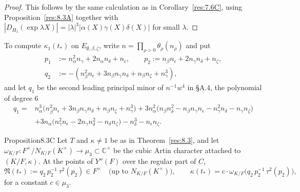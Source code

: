 \documentclass[12pt,letterpaper]{amsart}
\theoremstyle{plain}
\theoremstyle{definition}
\theoremstyle{remark}
\theoremstyle{definition}
\begin{document}
\begin{proof}
This follows by the same calculation as in Corollary~\ref{res:7.6C}, using
Proposition~\ref{res:8.3A} together with
$|D_{H_1}(\exp\lambda X)|=|\lambda|^3|\alpha(X)\gamma(X)\delta(X)|$ for small $\lambda$.
\end{proof}

To compute $\kappa_1(t_*)$ on $E_{\emptyset,\beta,\zeta}$, write
$n=\prod_{\rho>0}\theta_\rho(n_\rho)$ and put
\begin{equation}\tag{8.7b}\label{eq:8.7b}
\begin{split}
p_1&:=n_\alpha^2n_\gamma+2n_\alpha n_\delta+n_\epsilon,\qquad
p_2:=n_\beta n_\epsilon+2n_\gamma n_\delta+n_\zeta,\\
q_2&:=-(n_\beta^2n_\epsilon+3n_\beta n_\gamma n_\delta+n_\beta n_\zeta+n_\gamma^3),
\end{split}
\end{equation}
and let $q_1$ be the second leading principal minor of $n^{-1}w^4$ in \S A.4,
the polynomial of degree $6$
\begin{equation}\tag{8.7b$'$}\label{eq:8.7bprime}
\begin{split}
q_1={}&n_\alpha^3\bigl(n_\beta^2n_\epsilon+3n_\beta n_\gamma n_\delta+n_\beta n_\zeta+n_\gamma^3\bigr)
+3n_\alpha^2\bigl(n_\beta n_\delta^2-n_\beta n_\gamma n_\epsilon-n_\gamma^2n_\delta-n_\gamma n_\zeta\bigr)\\
&+3n_\alpha\bigl(n_\gamma^2n_\epsilon-2n_\gamma n_\delta^2-n_\delta n_\zeta\bigr)
-n_\delta^3-n_\epsilon n_\zeta .
\end{split}
\end{equation}

\begin{res}{Proposition}{8.3C}\label{res:8.3C}
Let $T$ and $\kappa\neq1$ be as in Theorem~\ref{res:8.3}, and let
$\omega_{K/F}:F^\times/N_{K/F}(K^\times)\to\mu_3\subset\mathbb C^\times$ be the
cubic Artin character attached to $(K/F,\kappa)$. At the points of $Y''(F)$ over
the regular part of $C$,
\[
\mathfrak N(t_*):=q_2\,p_2^{-1}\,\tau^2(p_2)\in F^\times
\quad\text{(up to $N_{K/F}(K^\times)$)},\qquad
\kappa(t_*)=c\cdot\omega_{K/F}\bigl(q_2\,p_2^{-1}\,\tau^2(p_2)\bigr),
\]
for a constant $c\in\mu_3$.
\end{res}
\end{document}
